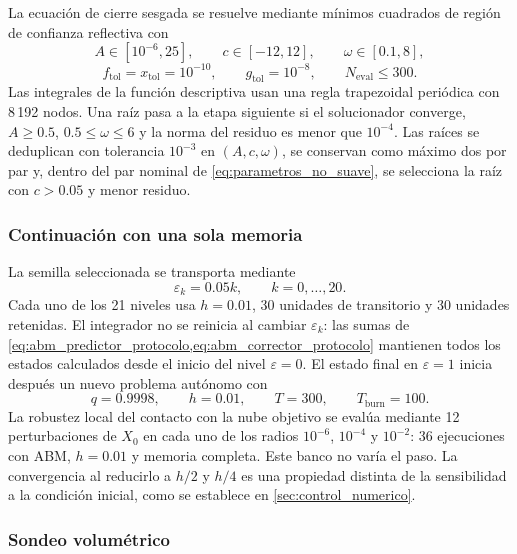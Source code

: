 La ecuación de cierre sesgada se resuelve mediante mínimos cuadrados de región
de confianza reflectiva con
\[
A\in[10^{-6},25],\qquad c\in[-12,12],\qquad
\omega\in[0.1,8],
\]
\[
f_{\mathrm{tol}}=x_{\mathrm{tol}}=10^{-10},\qquad
g_{\mathrm{tol}}=10^{-8},\qquad N_{\mathrm{eval}}\leq300.
\]
Las integrales de la función descriptiva usan una regla trapezoidal periódica
con 8\,192 nodos. Una raíz pasa a la etapa siguiente si el solucionador
converge, \(A\geq0.5\), \(0.5\leq\omega\leq6\) y la norma del residuo es menor
que \(10^{-4}\). Las raíces se deduplican con tolerancia \(10^{-3}\) en
\((A,c,\omega)\), se conservan como máximo dos por par y, dentro del par
nominal de \cref{eq:parametros_no_suave}, se selecciona la raíz con
\(c>0.05\) y menor residuo.

\subsubsection{Continuación con una sola memoria}

La semilla seleccionada se transporta mediante
\[
\varepsilon_k=0.05k,\qquad k=0,\ldots,20.
\]
Cada uno de los 21 niveles usa \(h=0.01\), 30 unidades de transitorio y 30
unidades retenidas. El integrador no se reinicia al cambiar
\(\varepsilon_k\): las sumas de
\cref{eq:abm_predictor_protocolo,eq:abm_corrector_protocolo} mantienen todos
los estados calculados desde el inicio del nivel \(\varepsilon=0\). El estado
final en \(\varepsilon=1\) inicia después un nuevo problema autónomo con
\[
q=0.9998,\qquad h=0.01,\qquad T=300,\qquad
T_{\mathrm{burn}}=100.
\]
La robustez local del contacto con la nube objetivo se evalúa mediante
12 perturbaciones de \(X_0\) en cada uno de los radios \(10^{-6}\),
\(10^{-4}\) y \(10^{-2}\): 36 ejecuciones con ABM, \(h=0.01\) y memoria
completa. Este banco no varía el paso. La convergencia al reducirlo a
\(h/2\) y \(h/4\) es una propiedad distinta de la sensibilidad a la
condición inicial, como se establece en \cref{sec:control_numerico}.

\subsubsection{Sondeo volumétrico}

